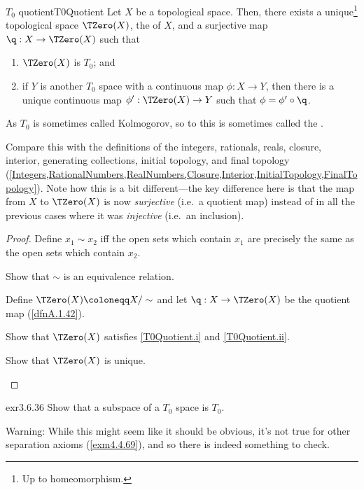 \begin{prp}{$T_0$ quotient}{T0Quotient}
Let $X$ be a topological space.  Then, there exists a unique\footnote{Up to homeomorphism.} topological space $\TZero (X)$, the  of $X$, and a surjective map $\q :X\rightarrow \TZero (X)$ such that
\begin{enumerate}
\item \label{T0Quotient.i}$\TZero (X)$ is $T_0$; and
\item \label{T0Quotient.ii}if $Y$ is another $T_0$ space with a continuous map $\phi :X\rightarrow Y$, then there is a unique continuous map $\phi ':\TZero (X)\rightarrow Y$ such that $\phi =\phi '\circ \q$.
\end{enumerate}
\begin{rmk}
As $T_0$ is sometimes called Kolmogorov, so to this is sometimes called the .
\end{rmk}
\begin{rmk}
Compare this with the definitions of the integers, rationals, reals, closure, interior, generating collections, initial topology, and final topology (\cref{Integers,RationalNumbers,RealNumbers,Closure,Interior,InitialTopology,FinalTopology}).  Note how this is a bit different---the key difference here is that the map from $X$ to $\TZero (X)$ is now \emph{surjective} (i.e.~a quotient map) instead of in all the previous cases where it was \emph{injective} (i.e.~an inclusion).
\end{rmk}
\begin{proof}
Define $x_1\sim x_2$ iff the open sets which contain $x_1$ are precisely the same as the open sets which contain $x_2$.
\begin{exr}[breakable=false]{}{}
Show that $\sim$ is an equivalence relation.
\end{exr}
Define $\TZero (X)\coloneqq X/\sim$ and let $\q :X\rightarrow \TZero (X)$ be the quotient map (\cref{dfnA.1.42}).
\begin{exr}[breakable=false]{}{}
Show that $\TZero (X)$ satisfies \cref{T0Quotient.i} and \cref{T0Quotient.ii}.
\end{exr}
\begin{exr}[breakable=false]{}{}
Show that $\TZero (X)$ is unique.
\end{exr}
\end{proof}
\end{prp}
\begin{exr}{}{exr3.6.36}
Show that a subspace of a $T_0$ space is $T_0$.
\begin{wrn}
Warning:  While this might seem like it should be obvious, it's not true for other separation axioms (\cref{exm4.4.69}), and so there is indeed something to check.
\end{wrn}
\end{exr}
